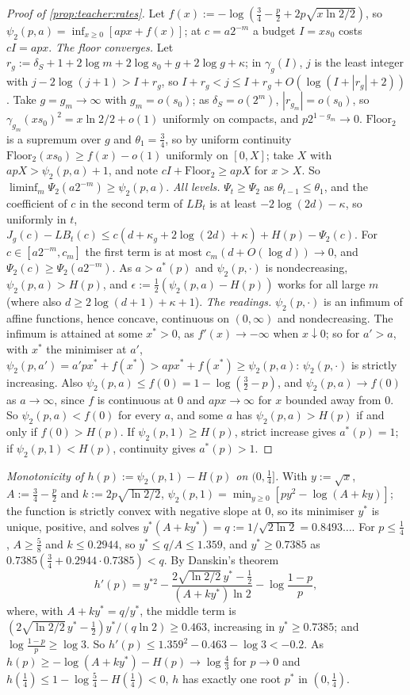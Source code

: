 \begin{proof}[Proof of \cref{prop:teacher:rates}]
Let $f(x):=-\log(\frac34-\frac p2+2p\sqrt{x\ln2/2})$, so $\psi_2(p,a)=\inf_{x\ge0}[apx+f(x)]$; at $c=a2^{-m}$ a budget $I=xs_0$ costs $cI=apx$.
\emph{The floor converges.} Let $r_g:=\delta_S+1+2\log m+2\log s_0+g+2\log g+\kappa$; in $\gamma_g(I)$, $j$ is the least integer with $j-2\log(j+1)>I+r_g$, so $I+r_g<j\le I+r_g+O(\log(I+|r_g|+2))$. Take $g=g_m\to\infty$ with $g_m=o(s_0)$; as $\delta_S=o(2^m)$, $|r_{g_m}|=o(s_0)$, so $\gamma_{g_m}(xs_0)^2=x\ln2/2+o(1)$ uniformly on compacts, and $p2^{1-g_m}\to0$. $\mathrm{Floor}_2$ is a supremum over $g$ and $\theta_1=\frac34$, so by uniform continuity $\mathrm{Floor}_2(xs_0)\ge f(x)-o(1)$ uniformly on $[0,X]$; take $X$ with $apX>\psi_2(p,a)+1$, and note $cI+\mathrm{Floor}_2\ge apX$ for $x>X$. So $\liminf_m\Psi_2(a2^{-m})\ge\psi_2(p,a)$.
\emph{All levels.} $\Psi_t\ge\Psi_2$ as $\theta_{t-1}\le\theta_1$, and the coefficient of $c$ in the second term of $LB_t$ is at least $-2\log(2d)-\kappa$, so uniformly in $t$, $J_g(c)-LB_t(c)\le c(d+\kappa_g+2\log(2d)+\kappa)+H(p)-\Psi_2(c)$. For $c\in[a2^{-m},c_m]$ the first term is at most $c_m(d+O(\log d))\to0$, and $\Psi_2(c)\ge\Psi_2(a2^{-m})$. As $a>a^*(p)$ and $\psi_2(p,\cdot)$ is nondecreasing, $\psi_2(p,a)>H(p)$, and $\epsilon:=\frac12(\psi_2(p,a)-H(p))$ works for all large $m$ (where also $d\ge2\log(d+1)+\kappa+1$).
\emph{The readings.} $\psi_2(p,\cdot)$ is an infimum of affine functions, hence concave, continuous on $(0,\infty)$ and nondecreasing. The infimum is attained at some $x^*>0$, as $f'(x)\to-\infty$ when $x\downarrow0$; so for $a'>a$, with $x^*$ the minimiser at $a'$, $\psi_2(p,a')=a'px^*+f(x^*)>apx^*+f(x^*)\ge\psi_2(p,a)$: $\psi_2(p,\cdot)$ is strictly increasing. Also $\psi_2(p,a)\le f(0)=1-\log(\frac32-p)$, and $\psi_2(p,a)\to f(0)$ as $a\to\infty$, since $f$ is continuous at $0$ and $apx\to\infty$ for $x$ bounded away from $0$. So $\psi_2(p,a)<f(0)$ for every $a$, and some $a$ has $\psi_2(p,a)>H(p)$ if and only if $f(0)>H(p)$. If $\psi_2(p,1)\ge H(p)$, strict increase gives $a^*(p)=1$; if $\psi_2(p,1)<H(p)$, continuity gives $a^*(p)>1$.
\end{proof}

\emph{Monotonicity of $h(p):=\psi_2(p,1)-H(p)$ on $(0,\frac14]$.} With $y:=\sqrt x$, $A:=\frac34-\frac p2$ and $k:=2p\sqrt{\ln2/2}$, $\psi_2(p,1)=\min_{y\ge0}[py^2-\log(A+ky)]$; the function is strictly convex with negative slope at $0$, so its minimiser $y^*$ is unique, positive, and solves $y^*(A+ky^*)=q:=1/\sqrt{2\ln2}=0.8493\ldots$. For $p\le\frac14$, $A\ge\frac58$ and $k\le0.2944$, so $y^*\le q/A\le1.359$, and $y^*\ge0.7385$ as $0.7385(\frac34+0.2944\cdot0.7385)<q$. By Danskin's theorem
\[
h'(p)=y^{*2}-\frac{2\sqrt{\ln2/2}\,y^*-\frac12}{(A+ky^*)\ln2}-\log\frac{1-p}p ,
\]
where, with $A+ky^*=q/y^*$, the middle term is $(2\sqrt{\ln2/2}\,y^*-\frac12)y^*/(q\ln2)\ge0.463$, increasing in $y^*\ge0.7385$; and $\log\frac{1-p}p\ge\log3$. So $h'(p)\le1.359^2-0.463-\log3<-0.2$. As $h(p)\ge-\log(A+ky^*)-H(p)\to\log\frac43$ for $p\to0$ and $h(\frac14)\le1-\log\frac54-H(\frac14)<0$, $h$ has exactly one root $p^*$ in $(0,\frac14)$.

